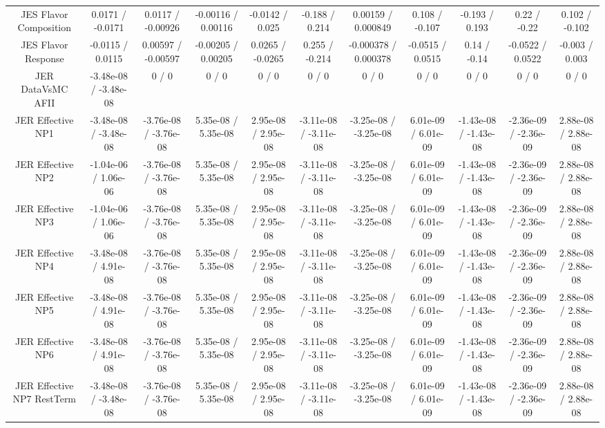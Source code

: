 \begin{table}[htbp]
\begin{center}
\begin{tabular}{|c|c|c|c|c|c|c|c|c|c|c|}
  JES Flavor Composition & 0.0171 / -0.0171 & 0.0117 / -0.00926 & -0.00116 / 0.00116 & -0.0142 / 0.025 & -0.188 / 0.214 & 0.00159 / 0.000849 & 0.108 / -0.107 & -0.193 / 0.193 & 0.22 / -0.22 & 0.102 / -0.102 \\ 
  JES Flavor Response & -0.0115 / 0.0115 & 0.00597 / -0.00597 & -0.00205 / 0.00205 & 0.0265 / -0.0265 & 0.255 / -0.214 & -0.000378 / 0.000378 & -0.0515 / 0.0515 & 0.14 / -0.14 & -0.0522 / 0.0522 & -0.003 / 0.003 \\ 
  JER DataVsMC AFII & -3.48e-08 / -3.48e-08 & 0 / 0 & 0 / 0 & 0 / 0 & 0 / 0 & 0 / 0 & 0 / 0 & 0 / 0 & 0 / 0 & 0 / 0 \\ 
  JER Effective NP1 & -3.48e-08 / -3.48e-08 & -3.76e-08 / -3.76e-08 & 5.35e-08 / 5.35e-08 & 2.95e-08 / 2.95e-08 & -3.11e-08 / -3.11e-08 & -3.25e-08 / -3.25e-08 & 6.01e-09 / 6.01e-09 & -1.43e-08 / -1.43e-08 & -2.36e-09 / -2.36e-09 & 2.88e-08 / 2.88e-08 \\ 
  JER Effective NP2 & -1.04e-06 / 1.06e-06 & -3.76e-08 / -3.76e-08 & 5.35e-08 / 5.35e-08 & 2.95e-08 / 2.95e-08 & -3.11e-08 / -3.11e-08 & -3.25e-08 / -3.25e-08 & 6.01e-09 / 6.01e-09 & -1.43e-08 / -1.43e-08 & -2.36e-09 / -2.36e-09 & 2.88e-08 / 2.88e-08 \\ 
  JER Effective NP3 & -1.04e-06 / 1.06e-06 & -3.76e-08 / -3.76e-08 & 5.35e-08 / 5.35e-08 & 2.95e-08 / 2.95e-08 & -3.11e-08 / -3.11e-08 & -3.25e-08 / -3.25e-08 & 6.01e-09 / 6.01e-09 & -1.43e-08 / -1.43e-08 & -2.36e-09 / -2.36e-09 & 2.88e-08 / 2.88e-08 \\ 
  JER Effective NP4 & -3.48e-08 / 4.91e-08 & -3.76e-08 / -3.76e-08 & 5.35e-08 / 5.35e-08 & 2.95e-08 / 2.95e-08 & -3.11e-08 / -3.11e-08 & -3.25e-08 / -3.25e-08 & 6.01e-09 / 6.01e-09 & -1.43e-08 / -1.43e-08 & -2.36e-09 / -2.36e-09 & 2.88e-08 / 2.88e-08 \\ 
  JER Effective NP5 & -3.48e-08 / 4.91e-08 & -3.76e-08 / -3.76e-08 & 5.35e-08 / 5.35e-08 & 2.95e-08 / 2.95e-08 & -3.11e-08 / -3.11e-08 & -3.25e-08 / -3.25e-08 & 6.01e-09 / 6.01e-09 & -1.43e-08 / -1.43e-08 & -2.36e-09 / -2.36e-09 & 2.88e-08 / 2.88e-08 \\ 
  JER Effective NP6 & -3.48e-08 / 4.91e-08 & -3.76e-08 / -3.76e-08 & 5.35e-08 / 5.35e-08 & 2.95e-08 / 2.95e-08 & -3.11e-08 / -3.11e-08 & -3.25e-08 / -3.25e-08 & 6.01e-09 / 6.01e-09 & -1.43e-08 / -1.43e-08 & -2.36e-09 / -2.36e-09 & 2.88e-08 / 2.88e-08 \\ 
  JER Effective NP7 RestTerm & -3.48e-08 / -3.48e-08 & -3.76e-08 / -3.76e-08 & 5.35e-08 / 5.35e-08 & 2.95e-08 / 2.95e-08 & -3.11e-08 / -3.11e-08 & -3.25e-08 / -3.25e-08 & 6.01e-09 / 6.01e-09 & -1.43e-08 / -1.43e-08 & -2.36e-09 / -2.36e-09 & 2.88e-08 / 2.88e-08 \\ 

\end{tabular}
\end{center}
\end{table}
